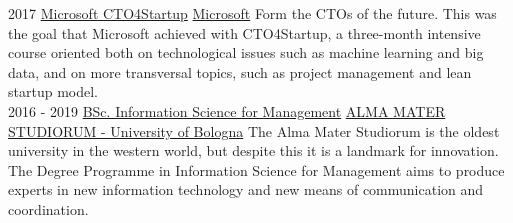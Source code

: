 \documentclass[]{friggeri-cv}
\begin{document}
\begin{entrylist}
    \entry
    {2017}
    {\href{https://www.facebook.com/CTO4Startup/}{Microsoft CTO4Startup}}
    {\href{https://www.microsoft.com}{Microsoft}}
    {Form the CTOs of the future. This was the goal that Microsoft achieved with CTO4Startup, a three-month intensive course oriented both on technological issues such as machine learning and big data, and on more transversal topics, such as project management and lean startup model.
    \\}
    \entry
    {2016 - 2019}
    {\href{http://www.unibo.it/en/teaching/degree-programmes/programme/2016/8014}{BSc. Information Science for Management}}
    {\href{http://www.unibo.it/en/homepage}{ALMA MATER STUDIORUM - University of Bologna}}
    {The Alma Mater Studiorum is the oldest university in the western world, but despite this it is a landmark for innovation. The Degree Programme in Information Science for Management aims to produce experts in new information technology and new means of communication and coordination. \\}
   
    
    \end{entrylist}
    
    \newpage
    
    
\end{document}
